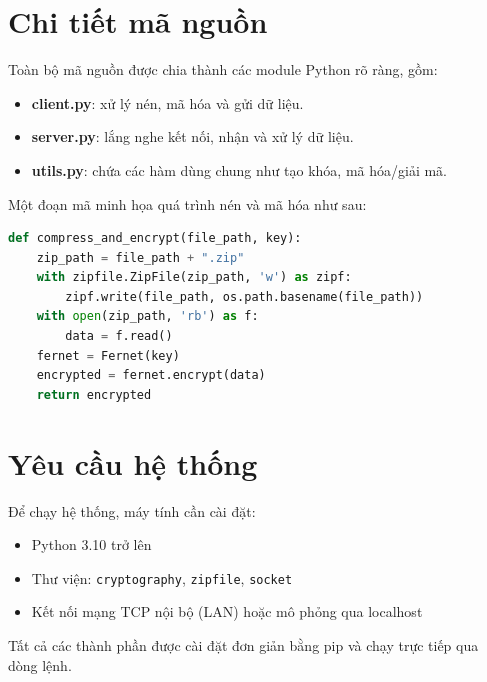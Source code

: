 \section{Chi tiết mã nguồn}

Toàn bộ mã nguồn được chia thành các module Python rõ ràng, gồm:

\begin{itemize}
  \item \textbf{client.py}: xử lý nén, mã hóa và gửi dữ liệu.
  \item \textbf{server.py}: lắng nghe kết nối, nhận và xử lý dữ liệu.
  \item \textbf{utils.py}: chứa các hàm dùng chung như tạo khóa, mã hóa/giải mã.
\end{itemize}

Một đoạn mã minh họa quá trình nén và mã hóa như sau:

\begin{lstlisting}[language=Python, caption={Hàm nén và mã hóa tệp tại client}, label={code:encrypt}]
def compress_and_encrypt(file_path, key):
    zip_path = file_path + ".zip"
    with zipfile.ZipFile(zip_path, 'w') as zipf:
        zipf.write(file_path, os.path.basename(file_path))
    with open(zip_path, 'rb') as f:
        data = f.read()
    fernet = Fernet(key)
    encrypted = fernet.encrypt(data)
    return encrypted
\end{lstlisting}

\section{Yêu cầu hệ thống}

Để chạy hệ thống, máy tính cần cài đặt:

\begin{itemize}
  \item Python 3.10 trở lên
  \item Thư viện: \texttt{cryptography}, \texttt{zipfile}, \texttt{socket}
  \item Kết nối mạng TCP nội bộ (LAN) hoặc mô phỏng qua localhost
\end{itemize}

Tất cả các thành phần được cài đặt đơn giản bằng pip và chạy trực tiếp qua dòng lệnh.

